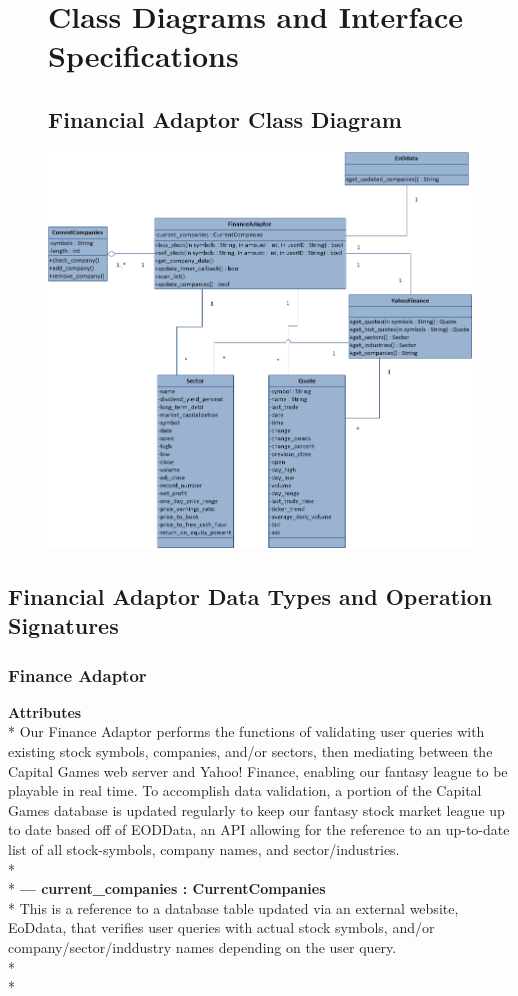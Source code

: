 \begin{figure}[!h]
\chapter{Class Diagrams and Interface Specifications}
\section{Financial Adaptor Class Diagram}
\centering
\includegraphics[width=5.5in]{./Diagrams/DomainModel/Financialdomainmodel.png}
\end{figure}

\clearpage

\section{Financial Adaptor Data Types and Operation Signatures}
\subsection{Finance Adaptor}
{\bfseries Attributes} \\*
Our Finance Adaptor performs the functions of validating user queries with 
existing stock symbols, companies, and/or sectors, then mediating between
the Capital Games web server and Yahoo! Finance, enabling our fantasy league
to be playable in real time.  To accomplish data validation, a portion of the
Capital Games database is updated regularly to keep our fantasy stock market
league up to date based off of EODData, an API allowing for the reference to
an up-to-date list of all stock-symbols, company names, and sector/industries. \\* \\*
{\bfseries --- current\_companies : CurrentCompanies } \\*
	This is a reference to a database table updated via an external website, EoDdata,
	that verifies user queries with actual stock symbols, and/or 
	company/sector/inddustry names depending on the user query. \\*\\*

